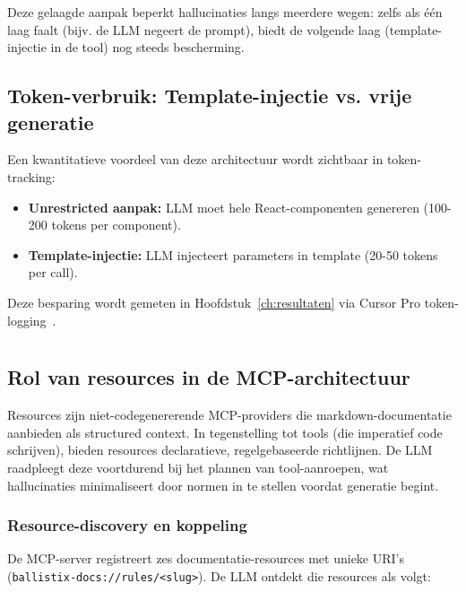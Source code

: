 Deze gelaagde aanpak beperkt hallucinaties langs meerdere wegen: zelfs als één laag faalt (bijv. de LLM negeert de prompt), biedt de volgende laag (template-injectie in de tool) nog steeds bescherming.

\subsection{Token-verbruik: Template-injectie vs. vrije generatie}

Een kwantitatieve voordeel van deze architectuur wordt zichtbaar in token-tracking:

\begin{itemize}
  \item \textbf{Unrestricted aanpak:} LLM moet hele React-componenten genereren (100-200 tokens per component).
  \item \textbf{Template-injectie:} LLM injecteert parameters in template (20-50 tokens per call).
\end{itemize}

Deze besparing wordt gemeten in Hoofdstuk~\ref{ch:resultaten} via Cursor Pro token-logging~\autocite{CursorTokenTracking2025}.

\section{}
\label{sec:poc-resources}

\subsection{Rol van resources in de MCP-architectuur}

Resources zijn niet-codegenererende MCP-providers die markdown-documentatie aanbieden als structured context. In tegenstelling tot tools (die imperatief code schrijven), bieden resources declaratieve, regelgebaseerde richtlijnen. De LLM raadpleegt deze voortdurend bij het plannen van tool-aanroepen, wat hallucinaties minimaliseert door normen in te stellen voordat generatie begint.

\subsubsection{Resource-discovery en koppeling}

De MCP-server registreert zes documentatie-resources met unieke URI's (\texttt{ballistix-docs://rules/<slug>}). De LLM ontdekt die resources als volgt:

